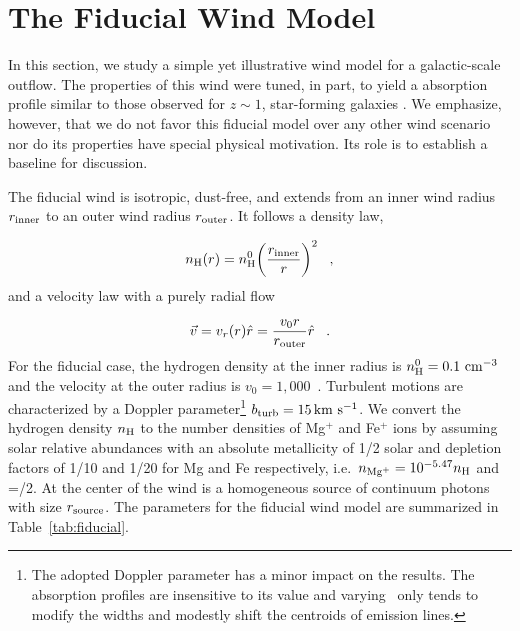 \documentclass[12pt,preprint]{aastex}
\begin{document}
\section{The Fiducial Wind Model}
\label{sec:fiducial}

In this section, we study a simple yet illustrative wind model for
a galactic-scale outflow.  The properties of this wind were tuned, in
part, to yield a  absorption profile 
similar to those observed for $z \sim 1$, star-forming galaxies
\citep{wcp+09,rubin+10c}.  We emphasize, however, that we do not
favor this fiducial model over any other wind scenario nor do its
properties have special physical motivation.
Its role is to establish a baseline
for discussion.

The fiducial wind is isotropic, dust-free, and extends from an inner wind
radius $r_{\rm inner}$ to an outer wind radius $r_{\rm outer}$.  
It follows a density law,

\begin{equation}
n_{\rm H} (r) = n^0_{\rm H} \biggl( \frac{r_{\rm inner}}{r}  \biggr)^2\;\;\; , 
\label{eqn:density}
\end{equation}
and a velocity law with a purely radial flow

\begin{equation}
\vec v = v_r (r) \hat r = \frac{v_0 r}{r_{\rm outer}} \hat r  \;\;\; .
\label{eqn:vel}
\end{equation}
For the fiducial case,  the hydrogen density at
the inner radius is $n_{\rm H}^0 = 0.1~{\rm cm}^{-3}$ and the
velocity at the outer radius is $v_0 = 1,000$~\kms. Turbulent motions are
characterized by a Doppler parameter\footnote{
  The adopted Doppler parameter
 has a minor impact on the results.
  The absorption profiles are insensitive to its value and varying \bturb\
  only tends to modify the widths and modestly
  shift the centroids of emission lines.} 
$b_{\rm turb} = 15 \, {\rm km~s^{-1}}$.  
We convert the hydrogen density $n_{\rm H}$ to the number densities of
Mg$^+$ and Fe$^+$ ions by assuming solar relative abundances with an
absolute metallicity of 1/2 solar and depletion factors of 1/10 and
1/20 for Mg and Fe respectively, i.e.\  $n_{\rm Mg^+} = 10^{-5.47} n_{\rm H}$ 
and \nfe=\nmg/2. At the center of the wind is a homogeneous source of
continuum photons with size $r_{\rm source}$. The parameters for the
fiducial wind model are summarized in Table~\ref{tab:fiducial}.   
\end{document}
